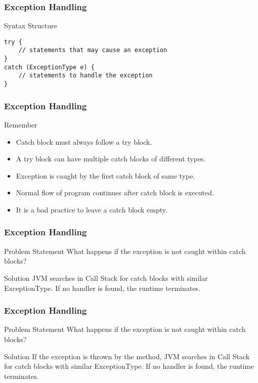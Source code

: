 \documentclass[10pt, compress]{beamer}
\begin{document}
\begin{frame}[fragile]
	\frametitle{Exception Handling}
	\begin{block}{Syntax Structure}
		\begin{verbatim}
try {
	// statements that may cause an exception
}
catch (ExceptionType e) {
	// statements to handle the exception
}
		\end{verbatim}
	\end{block}
\end{frame}

\begin{frame}[fragile]
	\frametitle{Exception Handling}
	\begin{block}{Remember}
		\begin{itemize}
			\item[] Catch block must always follow a try block.
			\item[] A try block can have multiple catch blocks of different types.
			\item[] Exception is caught by the first catch block of same type.
			\item[] Normal flow of program continues after catch block is executed.
			\item[] It is a bad practice to leave a catch block empty.
		\end{itemize}
	\end{block}
\end{frame}

\begin{frame}[fragile]
	\frametitle{Exception Handling}
	\begin{block}{Problem Statement}
		What happens if the exception is not caught within catch blocks?
	\end{block}
	\begin{block}{Solution}
		JVM searches in \alert{Call Stack} for catch blocks with similar ExceptionType. If no handler is found, the runtime terminates.
	\end{block}
\end{frame}

\begin{frame}[fragile]
	\frametitle{Exception Handling}
	\begin{block}{Problem Statement}
		What happens if the exception is not caught within catch blocks?
	\end{block}
	\begin{block}{Solution}
		If the exception is thrown by the method, JVM searches in \alert{Call Stack} for catch blocks with similar ExceptionType. If no handler is found, the runtime terminates.
	\end{block}
\end{frame}
\end{document}

